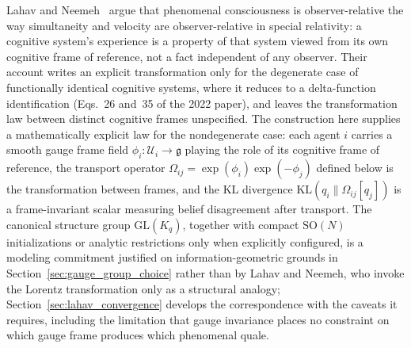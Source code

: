 \documentclass[11pt]{article}
\begin{document}
Lahav and Neemeh~\cite{LahavNeemeh2022, LahavNeemeh2025} argue that phenomenal consciousness is observer-relative the way simultaneity and velocity are observer-relative in special relativity: a cognitive system's experience is a property of that system viewed from its own cognitive frame of reference, not a fact independent of any observer. Their account writes an explicit transformation only for the degenerate case of functionally identical cognitive systems, where it reduces to a delta-function identification (Eqs.~26 and~35 of the 2022 paper), and leaves the transformation law between distinct cognitive frames unspecified. The construction here supplies a mathematically explicit law for the nondegenerate case: each agent $i$ carries a smooth gauge frame field $\phi_i: \mathcal{U}_i \to \mathfrak{g}$ playing the role of its cognitive frame of reference, the transport operator $\Omega_{ij} = \exp(\phi_i)\exp(-\phi_j)$ defined below is the transformation between frames, and the KL divergence $\mathrm{KL}(q_i \| \Omega_{ij}[q_j])$ is a frame-invariant scalar measuring belief disagreement after transport. The canonical structure group $\mathrm{GL}(K_q)$, together with compact $\mathrm{SO}(N)$ initializations or analytic restrictions only when explicitly configured, is a modeling commitment justified on information-geometric grounds in Section~\ref{sec:gauge_group_choice} rather than by Lahav and Neemeh, who invoke the Lorentz transformation only as a structural analogy; Section~\ref{sec:lahav_convergence} develops the correspondence with the caveats it requires, including the limitation that gauge invariance places no constraint on which gauge frame produces which phenomenal quale.
\end{document}
